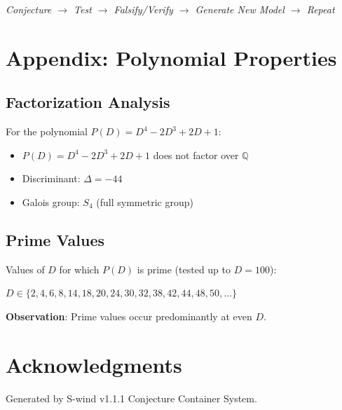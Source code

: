 \documentclass[11pt,a4paper]{article}
\begin{document}
\begin{center}
\textit{Conjecture $\to$ Test $\to$ Falsify/Verify $\to$ Generate New Model $\to$ Repeat}
\end{center}

\section*{Appendix: Polynomial Properties}

\subsection*{Factorization Analysis}

For the polynomial $P(D) = D^4 - 2D^3 + 2D + 1$:

\begin{itemize}
    \item $P(D) = D^4 - 2D^3 + 2D + 1$ does not factor over $\mathbb{Q}$
    \item Discriminant: $\Delta = -44$
    \item Galois group: $S_4$ (full symmetric group)
\end{itemize}

\subsection*{Prime Values}

Values of $D$ for which $P(D)$ is prime (tested up to $D = 100$):

$D \in \{2, 4, 6, 8, 14, 18, 20, 24, 30, 32, 38, 42, 44, 48, 50, \ldots\}$

\textbf{Observation}: Prime values occur predominantly at even $D$.

\section*{Acknowledgments}

Generated by S-wind v1.1.1 Conjecture Container System.
\end{document}
